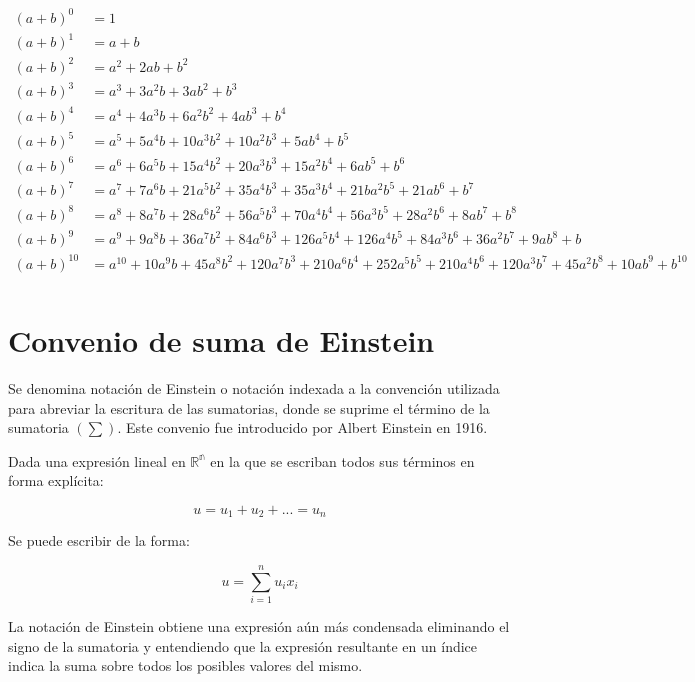 \documentclass{article}
\begin{document}
\begin{landscape}
	\begin{equation}
		\begin{split}
			(a+b)^0 &   = 1 \\
			(a+b)^1 &   = a+b \\
			(a+b)^2 &   = a^2+2ab+b^2 \\
			(a+b)^3 &   = a^3+3a^2b+3ab^2+b^3 \\
			(a+b)^4 &   = a^4+4a^3b+6a^2b^2+4ab^3+b^4 \\
			(a+b)^5 &   = a^5+5a^4b+10a^3b^2+10a^2b^3+5ab^4+b^5\\
			(a+b)^6 &   = a^6+6a^5b+15a^4b^2+20a^3b^3+15a^2b^4+6ab^5+b^6\\
			(a+b)^7 &   = a^7+7a^6b+21a^5b^2+35a^4b^3+35a^3b^4+21ba^2b^5+21ab^6+b^7 \\
			(a+b)^8 &   = a^8+8a^7b+28a^6b^2+56a^5b^3+70a^4b^4+56a^3b^5+28a^2b^6+8ab^7+b^8 \\
			(a+b)^9 &   = a^9+9a^8b+36a^7b^2+84a^6b^3+126a^5b^4+126a^4b^5+84a^3b^6+36a^2b^7+9ab^8+b \\
			(a+b)^{10} &    = a^{10}+10a^9b+45a^8b^2+120a^7b^3+210a^6b^4+252a^5b^5+210a^4b^6+120a^3b^7+45a^2b^8+10ab^9+b^{10} \\
		\end{split}
	\end{equation}
\end{landscape}

\section{Convenio de suma de Einstein}

Se denomina notación de Einstein o notación indexada a la convención utilizada
para abreviar la escritura de las sumatorias, donde se suprime el término de la
sumatoria $(\sum)$. Este convenio fue introducido por Albert Einstein en 1916.

Dada una expresión lineal en $\mathbb{R^n}$ en la que se escriban todos sus
términos en forma explícita:

\begin{equation}
    u = u_1 + u_2 + ... = u_n
\end{equation}

Se puede escribir de la forma:

\begin{equation}
    u = \sum_{i=1}^{n} u_ix_i
\end{equation}

La notación de Einstein obtiene una expresión aún más condensada eliminando el
signo de la sumatoria y entendiendo que la expresión resultante en un índice
indica la suma sobre todos los posibles valores del mismo.
\end{document}
